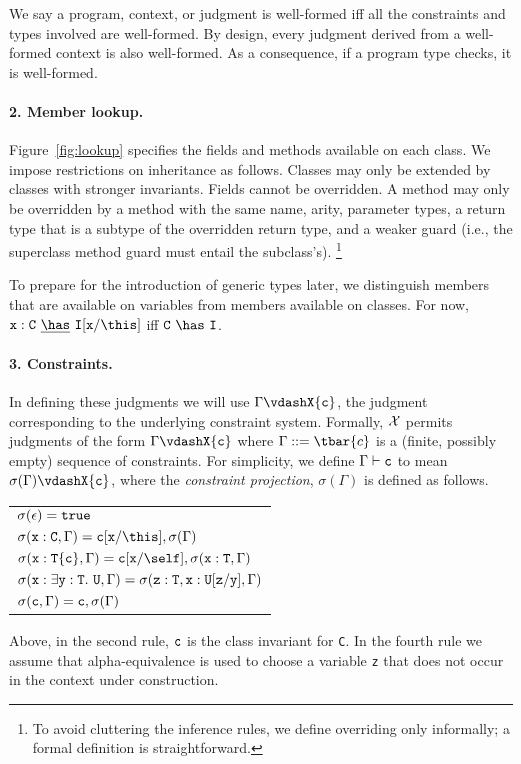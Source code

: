 We say a program, context, or judgment is well-formed iff all the constraints and types involved are well-formed. By design, every judgment derived from a well-formed context is also well-formed. As a consequence, if a program type checks, it is well-formed. 

\paragraph{2. Member lookup.} Figure~\ref{fig:lookup} specifies the fields and methods available on each class. We impose restrictions on inheritance as follows. Classes may only be extended by classes with stronger invariants. Fields cannot be overridden.
A method may only be overridden by a method with the same name,
arity, parameter types, a return type that is a subtype of the
overridden return type, and a weaker guard (i.e., the superclass
method guard must entail the subclass's).
\footnote{To avoid cluttering the inference rules, we
define overriding only informally; a formal definition is
straightforward.}

To prepare for the introduction of generic types later, we
distinguish members that are available on variables from members
available on classes.  For now,
${\tt x}:{\tt C}~\underline\has~{\tt I}[{\tt x}/\this]$ iff ${\tt C}~\has~{\tt I}$.

\paragraph{3. Constraints.}
In defining these judgments we will use \mbox{$\Gamma \vdashX {\tt c}$}, the judgment corresponding to the underlying constraint system. Formally, $\cal X$ permits judgments of the form $\Gamma \vdashX {\tt c}$ where $\Gamma::=\tbar{c}$ is a (finite, possibly empty) sequence of constraints. For simplicity, we define $\Gamma \vdash {\tt c}$ to mean
$\sigma(\Gamma)\vdashX {\tt c}$, where the {\em constraint
projection}, $\sigma(\Gamma)$ is defined as follows. 
%
\begin{center}
\begin{tabular}{l}
$\sigma(\epsilon)={\tt true}$\\
$\sigma({\tt x}:{\tt C}, \Gamma)={\tt c}[{\tt x}/\this],\sigma(\Gamma)$\\
$\sigma({\tt x}:{\tt T\{c\}}, \Gamma)={\tt c}[{\tt x}/\self], \sigma({\tt x}:{\tt T},\Gamma)$\\
$\sigma({\tt x}:\exists {\tt y}:{\tt T}.~{\tt U}, \Gamma)=\sigma({\tt z:T}, {\tt x}:{\tt U[{\tt z}/{\tt y}]},\Gamma)$\\
$\sigma({\tt c},\Gamma) = {\tt c}, \sigma(\Gamma)$
\end{tabular}
\end{center}
%
Above, in the second rule, ${\tt c}$ is the class invariant for {\tt C}.
In the fourth rule we assume that alpha-equivalence is used to
choose a variable {\tt z} that does not
occur in the context under construction.


